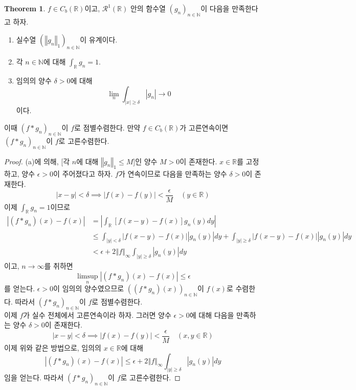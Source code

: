 \documentclass[11pt]{book}
\numberwithin{equation}{chapter}
\def\NN{\mathbb{N}}
\def\RR{\mathbb{R}}
\def\eps{\epsilon}
\def\calR{\mathcal{R}}
\newcommand{\abs}[1]{\left\vert#1\right\vert}
\newcommand{\norm}[1]{\left\Vert#1\right\Vert}
\theoremstyle{definition}
\newtheorem{thm}{Theorem}[section]
\newenvironment{enum}
	{\begin{enumerate}[label=(\alph*), leftmargin=2\parindent]}
	{\end{enumerate}}
\begin{document}
\begin{thm} \label{14.3.8}
    \(f \in C_b(\RR)\)이고, \(\calR^1(\RR)\) 안의 함수열 \((g_n)_{n \in \NN}\)이 다음을 만족한다고 하자.
    \begin{enum}
        \item 실수열 \((\norm{g_n}_1)_{n \in \NN}\)이 유계이다.
        \item 각 \(n \in \NN\)에 대해 \(\int_{\RR} g_n = 1\).
        \item 임의의 양수 \(\delta > 0\)에 대해
        \[
        \lim_{n} \int_{\abs{x} \ge \delta} \abs{g_n} \to 0    
        \]
        이다.
    \end{enum}
    이때 \((f * g_n)_{n \in \NN}\)이 \(f\)로 점별수렴한다. 만약 \(f \in C_b(\RR)\)가 고른연속이면 \((f * g_n)_{n \in \NN}\)이 \(f\)로 고른수렴한다.
\end{thm}
\begin{proof}
    (a)에 의해, [각 \(n\)에 대해 \(\norm{g_n}_1 \le M\)]인 양수 \(M > 0\)이 존재한다. \(x \in \RR\)를 고정하고, 양수 \(\eps > 0\)이 주어졌다고 하자. \(f\)가 연속이므로 다음을 만족하는 양수 \(\delta > 0\)이 존재한다.
    \[
    \abs{x - y} < \delta \implies \abs{f(x) - f(y)} < \frac{\eps}{M} \quad  (y \in \RR)
    \]
    이제 \(\int_\RR g_n = 1\)이므로
    \begin{align*}
        \abs{(f * g_n)(x) - f(x)} &= \abs{\int_\RR [f(x-y) - f(x)]g_n(y) dy}\\
        &\le \int_{\abs{y} < \delta} \abs{f(x-y) - f(x)}\abs{g_n(y)} dy + \int_{\abs{y} \ge \delta} \abs{f(x-y) - f(x)}\abs{g_n(y)} dy\\
        &< \eps + 2\norm{f}_{\infty} \int_{\abs{y} \ge \delta} \abs{g_n(y)} dy
    \end{align*}
    이고, \(n \to \infty\)를 취하면
    \[
    \limsup_n \abs{(f * g_n)(x) - f(x)} \le \eps
    \]
    를 얻는다. \(\eps > 0\)이 임의의 양수였으므로 \(((f * g_n)(x))_{n \in \NN}\)이 \(f(x)\)로 수렴한다. 따라서 \((f * g_n)_{n \in \NN}\)이 \(f\)로 점별수렴한다.\\
    이제 \(f\)가 실수 전체에서 고른연속이라 하자. 그러면 양수 \(\eps > 0\)에 대해 다음을 만족하는 양수 \(\delta > 0\)이 존재한다.
    \[
    \abs{x - y} < \delta \implies \abs{f(x) - f(y)} < \frac{\eps}{M} \quad  (x, y \in \RR)
    \]
    이제 위와 같은 방법으로, 임의의 \(x \in \RR\)에 대해
    \[
        \abs{(f * g_n)(x) - f(x)} \le \eps + 2\norm{f}_{\infty} \int_{\abs{y} \ge \delta} \abs{g_n(y)} dy
    \]
    임을 얻는다. 따라서 \((f * g_n)_{n \in \NN}\)이 \(f\)로 고른수렴한다.
\end{proof}
\end{document}

